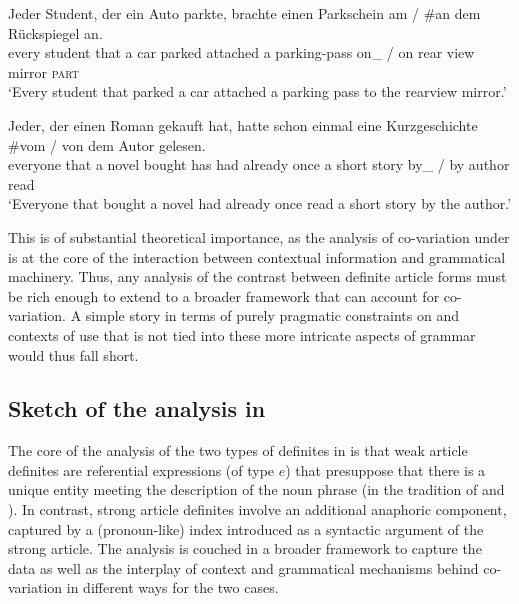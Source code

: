 \documentclass[output=paper
,modfonts
,nonflat]{langscibook}
\begin{document}
\begin{exe}
\ex {}
\begin{xlist}
\ex \gll Jeder Student, der {ein} {Auto} parkte, brachte einen Parkschein {am} \textnormal{/} \textnormal{\#}an {dem} {R\"uckspiegel} an.\\
every student that a car parked attached a {parking-pass} {on\_\theweak} / {\phantom{\#}}on {\thestrong} {rear view mirror} \textsc{part}\\
\glt `Every student that parked a car attached a parking pass to the rearview mirror.'

\ex\gll Jeder, der {einen} {Roman} gekauft hat, hatte schon einmal eine Kurzgeschichte \textnormal{\#}vom \textnormal{/} {von} {dem} {Autor} gelesen.\label{author}\\
everyone that a novel bought has had already once a {short story} {\phantom{\#}}{by\_\theweak} / by {\thestrong} author read\\
\glt `Everyone that bought a novel had already once read a short story
by the author.'
\end{xlist}
\end{exe}

This is of substantial theoretical importance, as the analysis of
co-variation under  is at the core of the interaction
between contextual information and grammatical machinery. Thus, any
analysis of the contrast between definite article forms must be rich
enough to extend to a broader framework that can account for
co-variation. A simple story in terms of purely pragmatic constraints on
 and contexts of use that is not tied into these more intricate aspects of
grammar would thus fall short.


\subsection{Sketch of the analysis in \citet{Schwarz2009}}

The core of the analysis of the two types of definites in
\citet{Schwarz2009} is that weak article definites are referential
expressions (of type $e$) that presuppose that there is a unique
entity meeting the description of the noun phrase (in the tradition of
\citeauthor{Frege1892} and \citeauthor{Strawson1950}). In contrast, strong article definites involve an
additional anaphoric component, captured by a (pronoun-like) index
introduced as
a syntactic argument of the strong article. The analysis
is couched in a broader framework to capture the  data as well
as the interplay of context
and grammatical mechanisms behind co-variation in different ways for
the two cases. 
\end{document}
